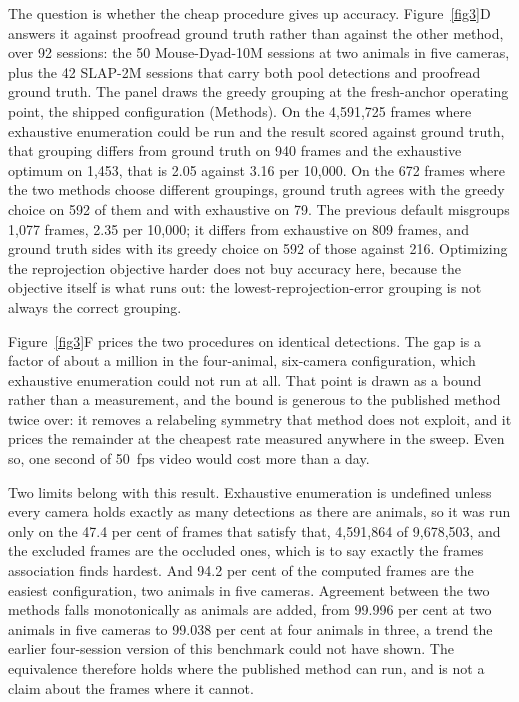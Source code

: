 \documentclass[pdflatex, sn-nature]{sn-jnl}
\theoremstyle{thmstyleone}%
\theoremstyle{thmstyletwo}%
\theoremstyle{thmstylethree}%
\begin{document}
The question is whether the cheap procedure gives up accuracy. Figure~\ref{fig3}D answers it against proofread ground truth rather than against the other method, over 92 sessions: the 50 Mouse-Dyad-10M sessions at two animals in five cameras, plus the 42 SLAP-2M sessions that carry both pool detections and proofread ground truth. The panel draws the greedy grouping at the fresh-anchor operating point, the shipped configuration (Methods). On the 4,591,725 frames where exhaustive enumeration could be run and the result scored against ground truth, that grouping differs from ground truth on 940 frames and the exhaustive optimum on 1,453, that is 2.05 against 3.16 per 10,000. On the 672 frames where the two methods choose different groupings, ground truth agrees with the greedy choice on 592 of them and with exhaustive on 79. The previous default misgroups 1,077 frames, 2.35 per 10,000; it differs from exhaustive on 809 frames, and ground truth sides with its greedy choice on 592 of those against 216. Optimizing the reprojection objective harder does not buy accuracy here, because the objective itself is what runs out: the lowest-reprojection-error grouping is not always the correct grouping.

Figure~\ref{fig3}F prices the two procedures on identical detections. The gap is a factor of about a million in the four-animal, six-camera configuration, which exhaustive enumeration could not run at all. That point is drawn as a bound rather than a measurement, and the bound is generous to the published method twice over: it removes a relabeling symmetry that method does not exploit, and it prices the remainder at the cheapest rate measured anywhere in the sweep. Even so, one second of 50~fps video would cost more than a day.

Two limits belong with this result. Exhaustive enumeration is undefined unless every camera holds exactly as many detections as there are animals, so it was run only on the 47.4 per cent of frames that satisfy that, 4,591,864 of 9,678,503, and the excluded frames are the occluded ones, which is to say exactly the frames association finds hardest. And 94.2 per cent of the computed frames are the easiest configuration, two animals in five cameras. Agreement between the two methods falls monotonically as animals are added, from 99.996 per cent at two animals in five cameras to 99.038 per cent at four animals in three, a trend the earlier four-session version of this benchmark could not have shown. The equivalence therefore holds where the published method can run, and is not a claim about the frames where it cannot.
\end{document}
